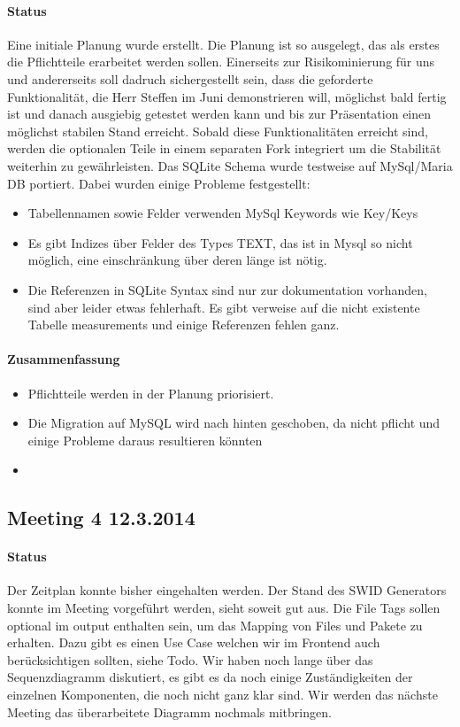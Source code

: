 \paragraph{Status}
Eine initiale Planung wurde erstellt. Die Planung ist so ausgelegt, das als erstes die Pflichtteile erarbeitet werden sollen. Einerseits zur Risikominierung für uns und andererseits soll dadruch sichergestellt sein, dass die geforderte Funktionalität,  die Herr Steffen im Juni demonstrieren will, möglichst bald fertig ist und danach ausgiebig getestet werden kann und bis zur Präsentation einen möglichst stabilen Stand erreicht. Sobald diese Funktionalitäten erreicht sind, werden die optionalen Teile in einem separaten Fork integriert um die Stabilität weiterhin zu gewährleisten.
Das SQLite Schema wurde testweise auf MySql/Maria DB portiert. Dabei wurden einige Probleme festgestellt:
\begin{itemize}
\item Tabellennamen sowie Felder verwenden MySql Keywords wie Key/Keys
\item Es gibt Indizes über Felder des Types TEXT, das ist in Mysql so nicht möglich, eine einschränkung über deren länge ist nötig.
\item Die Referenzen in SQLite Syntax sind nur zur dokumentation vorhanden, sind aber leider etwas fehlerhaft. Es gibt verweise auf die nicht existente Tabelle measurements und einige Referenzen fehlen ganz. 
\end{itemize}

\paragraph{Zusammenfassung}

\begin{itemize}
\item Pflichtteile werden in der Planung priorisiert.
\item Die Migration auf MySQL wird nach hinten geschoben, da nicht pflicht und einige Probleme daraus resultieren könnten
\item
\end{itemize}
\subsection{Meeting 4 12.3.2014}
\paragraph{Status}
Der Zeitplan konnte bisher eingehalten werden. Der Stand des SWID Generators konnte im Meeting vorgeführt werden, sieht soweit gut aus. 
Die File Tags sollen optional im output enthalten sein, um das Mapping von Files und Pakete zu erhalten. Dazu gibt es einen Use Case welchen wir im Frontend auch berücksichtigen sollten, siehe Todo. Wir haben noch lange über das Sequenzdiagramm diskutiert, es gibt es da noch einige Zuständigkeiten der einzelnen Komponenten, die noch nicht ganz klar sind. Wir werden das nächste Meeting das überarbeitete Diagramm nochmals mitbringen.

